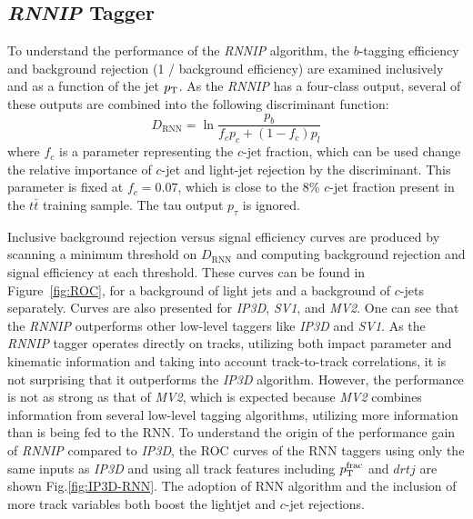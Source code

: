\subsection{\textit{RNNIP} Tagger}

\label{sec:rnn-result-rnn}

To understand the performance of the \textit{RNNIP} algorithm, the $b$-tagging efficiency and background rejection (1 / background efficiency) are examined inclusively and as a function of the jet $p_{{\rm T}}$. As the \textit{RNNIP} has a four-class output, several of these outputs are combined into the following discriminant function:
\begin{equation}
D_{\mathrm{RNN}} = \ln \frac{p_{b}}{f_c p_c + (1-f_c) p_l}
\end{equation}
where $f_c$ is a parameter representing the $c$-jet fraction, which can be used change the relative importance of $c$-jet and light-jet rejection by the discriminant.  This parameter is fixed at $f_c=0.07$, which is close to the 8\% $c$-jet fraction present in the $t\bar{t}$ training sample. The tau output $p_\tau$ is ignored.

Inclusive background rejection versus signal efficiency curves are produced by scanning a minimum threshold on $D_{\mathrm{RNN}}$ and computing background rejection and signal efficiency at each threshold. These curves can be found in Figure~\ref{fig:ROC}, for a background of light jets and a background of $c$-jets separately.  Curves are also presented for \textit{IP3D}, \textit{SV1}, and \textit{MV2}. One can see that the \textit{RNNIP} outperforms other low-level taggers like \textit{IP3D} and \textit{SV1}. As the \textit{RNNIP} tagger operates directly on tracks, utilizing both impact parameter and kinematic information and taking into account track-to-track correlations, it is not surprising that it outperforms the \textit{IP3D} algorithm.  However, the performance is not as strong as that of \textit{MV2}, which is expected because \textit{MV2} combines information from several low-level tagging algorithms, utilizing more information than is being fed to the RNN. To understand the origin of the performance gain of \textit{RNNIP} compared to \textit{IP3D}, the ROC curves of the RNN taggers using only the same inputs as \textit{IP3D} and using all track features including $p_{\rm T}^{\rm frac}$ and $drtj$ are shown Fig.\ref{fig:IP3D-RNN}. The adoption of RNN algorithm and the inclusion of more track variables both boost the lightjet and $c$-jet rejections.

